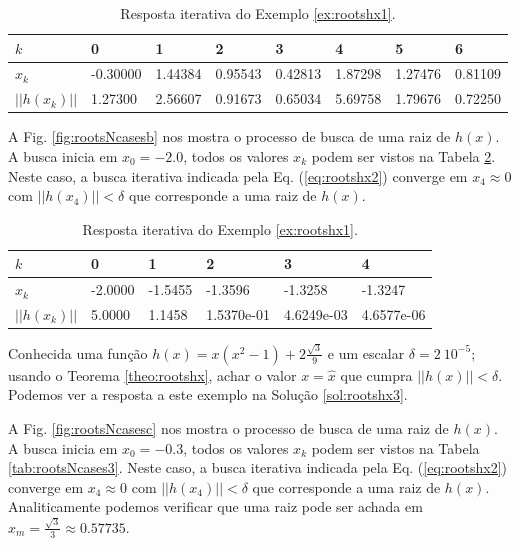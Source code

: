 \begin{table}[!h]
\centering
\begin{tabular}{|l|l|l|l|l|l|l|l|}
\hline
$k$      & 0 & 1 & 2 & 3 & 4 & 5 & 6\\ \hline
$x_k$    & -0.30000 & 1.44384 & 0.95543 & 0.42813 & 1.87298 & 1.27476 & 0.81109 \\ \hline
$||h(x_k)||$ & 1.27300 & 2.56607 & 0.91673 & 0.65034 & 5.69758 & 1.79676 & 0.72250 \\ \hline
\end{tabular}
\caption{Resposta iterativa do Exemplo \ref{ex:rootshx1}.}
\label{tab:rootsNcases1}
\end{table}

\begin{SolutionT}\label{sol:rootshx2}
A Fig. \ref{fig:rootsNcasesb} nos mostra o processo de busca de uma raiz de $h(x)$. 
A busca inicia em $x_0=-2.0$,
 todos os valores $x_{k}$ podem ser vistos na Tabela \ref{tab:rootsNcases2}. 
Neste caso, a busca iterativa indicada pela Eq. (\ref{eq:rootshx2}) converge 
em $x_4\approx 0$ com $||h(x_4)||<\delta$ que corresponde a uma raiz de $h(x)$.
\end{SolutionT}

\begin{table}[!h]
\centering
\begin{tabular}{|l|l|l|l|l|l|}
\hline
$k$      & 0 & 1 & 2 & 3 & 4 \\ \hline
$x_k$    & -2.0000 & -1.5455 & -1.3596 & -1.3258 & -1.3247 \\ \hline
$||h(x_k)||$ & 5.0000 &  1.1458 & 1.5370e-01 & 4.6249e-03 & 4.6577e-06 \\ \hline
\end{tabular}
\caption{Resposta iterativa do Exemplo \ref{ex:rootshx1}.}
\label{tab:rootsNcases2}
\end{table}

\begin{example}\label{ex:rootshx2}
Conhecida uma função $h(x)=x(x^2-1)+2\frac{\sqrt{3}}{9}$ e um escalar $\delta=2~10^{-5}$;
usando o Teorema \ref{theo:rootshx},
achar o valor $x=\hat{x}$ que cumpra $||h(x)||<\delta$.
Podemos ver a resposta a este exemplo na Solução \ref{sol:rootshx3}.
\end{example}

\begin{SolutionT}\label{sol:rootshx3}
A Fig. \ref{fig:rootsNcasesc} nos mostra o processo de busca de uma raiz de $h(x)$. 
A busca inicia em $x_0=-0.3$,
 todos os valores $x_{k}$ podem ser vistos na Tabela \ref{tab:rootsNcases3}. 
Neste caso, a busca iterativa indicada pela Eq. (\ref{eq:rootshx2}) converge 
em $x_4\approx 0$ com $||h(x_4)||<\delta$ que corresponde a uma raiz de $h(x)$.
Analiticamente podemos verificar que uma raiz pode ser achada em $x_m=\frac{\sqrt{3}}{3}\approx 0.57735$.
\end{SolutionT}

